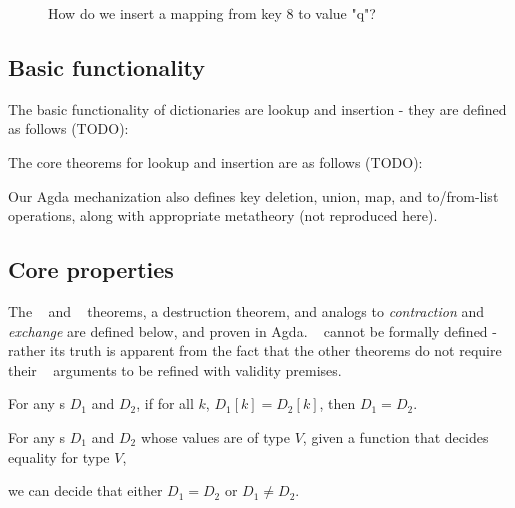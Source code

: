 \begin{figure}[H]
  \centering
  \caption{How do we insert a mapping from key $8$ to value "q"?}
  \label{fig:find-6}
\end{figure}

\subsection{Basic functionality}
\label{sec:DD:basics}
The basic functionality of dictionaries are lookup and insertion - they are defined as follows
(TODO):

The core theorems for lookup and insertion are as follows (TODO):

Our Agda mechanization also defines key deletion, union, map, and to/from-list operations, along
with appropriate metatheory (not reproduced here).

\subsection{Core properties}
\label{sec:DD:props}
The \SemInj~ and \EqDec~ theorems, a destruction theorem, and analogs to \emph{contraction} and
\emph{exchange} are defined below, and proven in Agda. \SemTot~ cannot be formally defined - rather
its truth is apparent from the fact that the other theorems do not require their \dd~ arguments to
be refined with validity premises.

\begin{theorem}[\SemInj]
\label{thm:SemInj}

\breakAndIndent
%
For any {\dd}s $D_1$ and $D_2$,
%
if for all $k$, $D_1[k] = D_2[k]$,
%
then $D_1 = D_2$.

\end{theorem}

\begin{theorem}[\EqDec]
\label{thm:EqDec}

\breakAndIndent
%
For any {\dd}s $D_1$ and $D_2$ whose values are of type $V$,
%
given a function that decides equality for type $V$,
%

\justIndent
%
we can decide that either $D_1 = D_2$ or $D_1 \ne D_2$.

\end{theorem}

